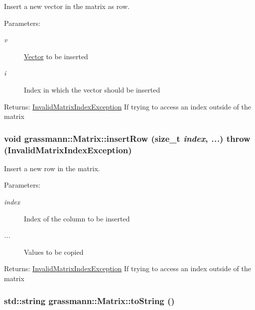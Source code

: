 Insert a new vector in the matrix as row. 

\begin{Desc}
\item[Parameters:]
\begin{description}
\item[{\em v}]\hyperlink{classgrassmann_1_1Vector}{Vector} to be inserted \item[{\em i}]Index in which the vector should be inserted \end{description}
\end{Desc}
\begin{Desc}
\item[Returns:]\hyperlink{classgrassmann_1_1InvalidMatrixIndexException}{InvalidMatrixIndexException} If trying to access an index outside of the matrix \end{Desc}
\hypertarget{classgrassmann_1_1Matrix_aee2dee4214a333a2e67525fd76b1db5}{
\subsubsection[insertRow]{\setlength{\rightskip}{0pt plus 5cm}void grassmann::Matrix::insertRow (size\_\-t {\em index}, \/   {\em ...})  throw ({\bf InvalidMatrixIndexException})}}
\label{classgrassmann_1_1Matrix_aee2dee4214a333a2e67525fd76b1db5}


Insert a new row in the matrix. 

\begin{Desc}
\item[Parameters:]
\begin{description}
\item[{\em index}]Index of the column to be inserted \item[{\em ...}]Values to be copied \end{description}
\end{Desc}
\begin{Desc}
\item[Returns:]\hyperlink{classgrassmann_1_1InvalidMatrixIndexException}{InvalidMatrixIndexException} If trying to access an index outside of the matrix \end{Desc}
\hypertarget{classgrassmann_1_1Matrix_3638d902b9824845ae04a02060ca62e5}{
\subsubsection[toString]{\setlength{\rightskip}{0pt plus 5cm}std::string grassmann::Matrix::toString ()}}
\label{classgrassmann_1_1Matrix_3638d902b9824845ae04a02060ca62e5}


